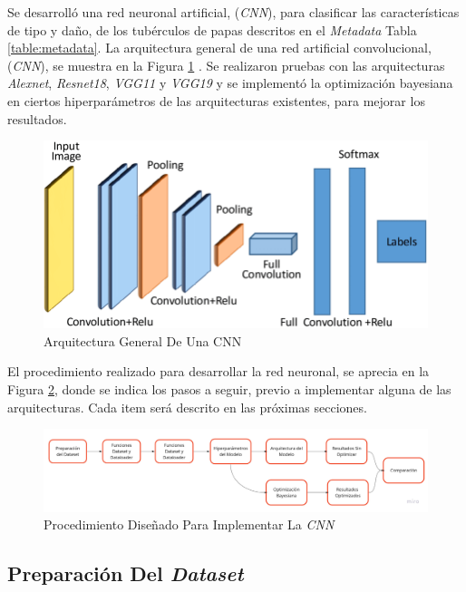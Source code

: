 	Se desarrolló una red neuronal artificial, (\textit{CNN}), para clasificar las características de tipo y daño, de los tubérculos de papas descritos en el \textit{Metadata} Tabla \ref{table:metadata}. La arquitectura general de una red artificial convolucional, (\textit{CNN}), se muestra en la Figura \ref{fig:cnnarchitecture} \cite{cnnarchitecture}. Se realizaron pruebas con las arquitecturas \textit{Alexnet}, \textit{Resnet18}, \textit{VGG11} y \textit{VGG19} y se implementó la optimización bayesiana en ciertos hiperparámetros de las arquitecturas existentes, para mejorar los resultados. 
	
	\begin{figure}[ht]
		\centering
		\includegraphics[scale=0.25]{Figs/A-generic-CNN-Architecture.png}
		\caption{Arquitectura General De Una CNN}
		\label{fig:cnnarchitecture}
	\end{figure}	
	
	El procedimiento realizado para desarrollar la red neuronal, se aprecia en la Figura \ref{fig:procedimiento}, donde se indica los pasos a seguir, previo a implementar alguna de las arquitecturas. Cada item será descrito en las próximas secciones.  


	\begin{figure}[ht]
		\centering
		\includegraphics[scale=0.2]{Figs/procedimiento.jpg}
		\caption{Procedimiento Diseñado Para Implementar La \textit{CNN}}
		\label{fig:procedimiento}
	\end{figure}	


		\newpage
		\subsection{Preparación Del \textit{Dataset}}
			
